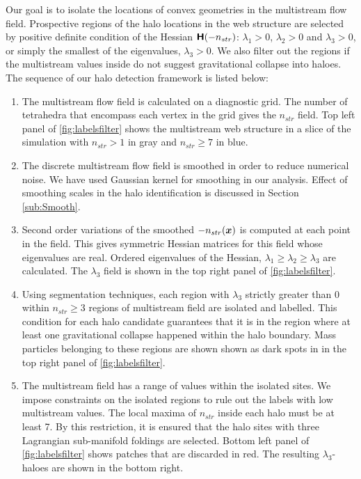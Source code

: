 \documentclass[fleqn,usenatbib,useAMS]{mnras}
\begin{document}
{Our goal is to isolate the locations of convex geometries in the multistream flow field. Prospective regions of the halo locations in the web structure are selected by positive definite condition of the Hessian $\textbf{\textsf{H}}(-n_{str})$: $\lambda_1 > 0$, $\lambda_2 > 0$ and  $\lambda_3 > 0$, or simply the smallest of the eigenvalues, $\lambda_3 > 0$. We also filter out the regions if the multistream values inside do not suggest gravitational collapse into haloes. The sequence of our halo detection framework is listed below: 


\begin{enumerate}
\item The multistream flow field is calculated on a diagnostic grid. The number of tetrahedra that encompass each vertex in the grid gives the $n_{str}$ field. Top left panel of \autoref{fig:labelsfilter} shows the multistream web structure in a slice of the simulation with $n_{str} > 1$ in gray and $n_{str} \geq 7$ in blue.  

\item The discrete multistream flow field is smoothed in order to reduce numerical noise. We have used Gaussian kernel for smoothing in our analysis. Effect of smoothing scales in the halo identification is discussed in Section \ref{sub:Smooth}. 

\item Second order variations of the smoothed $-n_{str}(\bmath{x})$ is computed at each point in the field. This gives symmetric Hessian matrices for this field whose eigenvalues are real. Ordered eigenvalues of the Hessian, $ \lambda_1 \geq  \lambda_2 \geq \lambda_3$ are calculated. The $\lambda_3$ field is shown in the top right panel of \autoref{fig:labelsfilter}. 

\item Using segmentation techniques, each region with $ \lambda_3 $ strictly greater than $0$ within $n_{str} \geq 3$ regions of multistream field are isolated and labelled. This condition for each halo candidate guarantees that it is in the region where at least one gravitational collapse happened within the halo boundary. Mass particles belonging to these regions are shown shown as dark spots in in the top right panel of \autoref{fig:labelsfilter}. 

\item The multistream field has a range of values within the isolated sites. We impose constraints on the isolated regions to rule out the labels with low multistream values. The local maxima of $n_{str}$ inside each halo must be at least 7. By this restriction, it is ensured that the halo sites with three Lagrangian sub-manifold foldings are selected. Bottom left panel of \autoref{fig:labelsfilter} shows patches that are discarded in red. The resulting $\lambda_3$-haloes are shown in the bottom right.  
  


\end{enumerate}}
\end{document}
